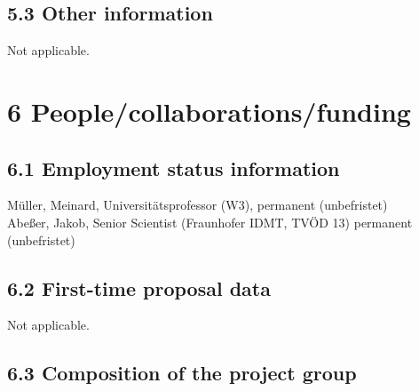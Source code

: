 \documentclass[11pt,a4paper]{article}
\theoremstyle{plain} \newtheorem{define}{Definition}[section]
\begin{document}
{\subsection*{5.3 Other information}
%
\vspace{-0.4cm}
Not applicable.
\vspace{-0.4cm}


\section*{6 People/collaborations/funding}

\subsection*{6.1 Employment status information}
\vspace{-0.4cm}
M\"uller, Meinard, Universit\"atsprofessor (W3), permanent (unbefristet)\\
Abe{\ss}er, Jakob, Senior Scientist (Fraunhofer IDMT, TV\"OD 13) permanent (unbefristet)
\vspace{-0.4cm}

\subsection*{6.2 First-time proposal data}
%
\vspace{-0.4cm}
Not applicable.


\subsection*{6.3 Composition of the project group}

}
\end{document}
